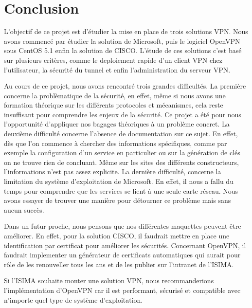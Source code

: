 \section*{Conclusion}

L'objectif de ce projet est d'étudier la mise en place de trois solutions VPN. Nous avons commencé par étudier la solution de Microsoft, puis le logiciel OpenVPN sous CentOS 5.1 enfin la solution de CISCO. L'étude de ces solutions c'est basé sur plusieurs critères, comme le deploiement rapide d'un client VPN chez l'utilisateur, la sécurité du tunnel et enfin l'administration du serveur VPN.
 
Au cours de ce projet, nous avons rencontré trois grandes difficultés. La première concerne la problèmatique de la sécurité, en effet, même si nous avons une formation théorique sur les différents protocoles et mécanismes, cela reste insuffisant pour comprendre les enjeux de la sécurité. Ce projet a été pour nous l'opportunité d'appliquer nos bagages théoriques à un problème concret.
La deuxième difficulté concerne l'absence de documentation sur ce sujet. En effet, dès que l'on commence à chercher des informations spécifiques, comme par exemple la configuration d'un service en particulier ou sur la génération de clés on ne trouve rien de concluant. Même sur les sites des différents constructeurs, l'informations n'est pas assez explicite.
La dernière difficulté, concerne la limitation du système d'exploitation de Microsoft. En effet, il nous a fallu du temps pour comprendre que les services se lient à une seule carte réseau. Nous avons essayer de trouver une manière pour détourner ce problème mais sans aucun succès.   

Dans un futur proche, nous pensons que nos différentes maquettes peuvent être améliorer. En effet, pour la solution CISCO, il faudrait mettre en place une identification par certificat pour améliorer les sécurités. Concernant OpenVPN, il faudrait implementer un générateur de certificats automatiques qui aurait pour rôle de les renouveller tous les ans et de les publier sur l'intranet de l'ISIMA. 


Si l'ISIMA souhaite monter une solution VPN, nous recommanderions l'implémentation d'OpenVPN car il est performant, sécurisé et compatible avec n'importe quel type de système d'exploitation.


\pagebreak
